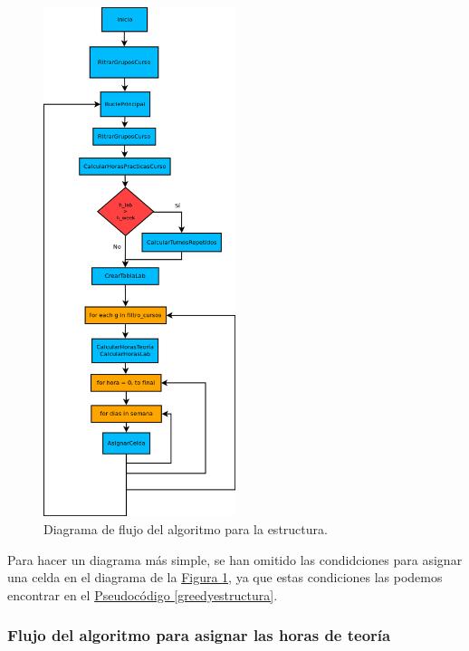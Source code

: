 \begin{figure}[H]
\centering
\includegraphics[width=0.5\textwidth]{img/d1}
\caption{Diagrama de flujo del algoritmo para la estructura.}
\label{d1}
\end{figure}

Para hacer un diagrama más simple, se han omitido las condidciones para asignar una celda en el diagrama de la \hyperref[d1]{Figura \ref*{d1}}, ya que estas condiciones las podemos encontrar en el \hyperref[greedyestructura]{Pseudocódigo \ref*{greedyestructura}}.

\subsubsection{Flujo del algoritmo para asignar las horas de teoría}

